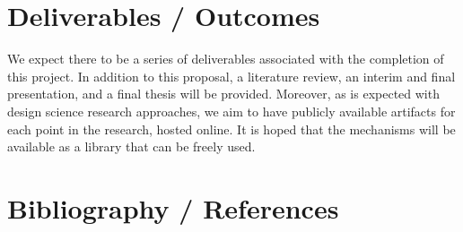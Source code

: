 \documentclass[12pt, a4paper]{article}
\begin{document}
\section{Deliverables / Outcomes}
We expect there to be a series of deliverables associated with the completion of this project. In addition to this proposal, a literature review, an interim and final presentation, and a final thesis will be provided. Moreover, as is expected with design science research approaches, we aim to have publicly available artifacts for each point in the research, hosted online. It is hoped that the mechanisms will be available as a library that can be freely used.

\section{Bibliography / References}


\end{document}

